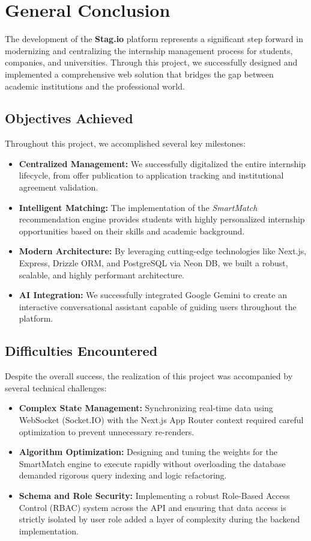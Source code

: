\cleardoublepage
{}
{}
\chapter*{General Conclusion}

The development of the \textbf{Stag.io} platform represents a significant step forward in modernizing and centralizing the internship management process for students, companies, and universities. Through this project, we successfully designed and implemented a comprehensive web solution that bridges the gap between academic institutions and the professional world.

\section*{Objectives Achieved}
Throughout this project, we accomplished several key milestones:
\begin{itemize}
    \item \textbf{Centralized Management:} We successfully digitalized the entire internship lifecycle, from offer publication to application tracking and institutional agreement validation.
    \item \textbf{Intelligent Matching:} The implementation of the \textit{SmartMatch} recommendation engine provides students with highly personalized internship opportunities based on their skills and academic background.
    \item \textbf{Modern Architecture:} By leveraging cutting-edge technologies like Next.js, Express, Drizzle ORM, and PostgreSQL via Neon DB, we built a robust, scalable, and highly performant architecture.
    \item \textbf{AI Integration:} We successfully integrated Google Gemini to create an interactive conversational assistant capable of guiding users throughout the platform.
\end{itemize}

\section*{Difficulties Encountered}
Despite the overall success, the realization of this project was accompanied by several technical challenges:
\begin{itemize}
    \item \textbf{Complex State Management:} Synchronizing real-time data using WebSocket (Socket.IO) with the Next.js App Router context required careful optimization to prevent unnecessary re-renders.
    \item \textbf{Algorithm Optimization:} Designing and tuning the weights for the SmartMatch engine to execute rapidly without overloading the database demanded rigorous query indexing and logic refactoring.
    \item \textbf{Schema and Role Security:} Implementing a robust Role-Based Access Control (RBAC) system across the API and ensuring that data access is strictly isolated by user role added a layer of complexity during the backend implementation.
\end{itemize}

